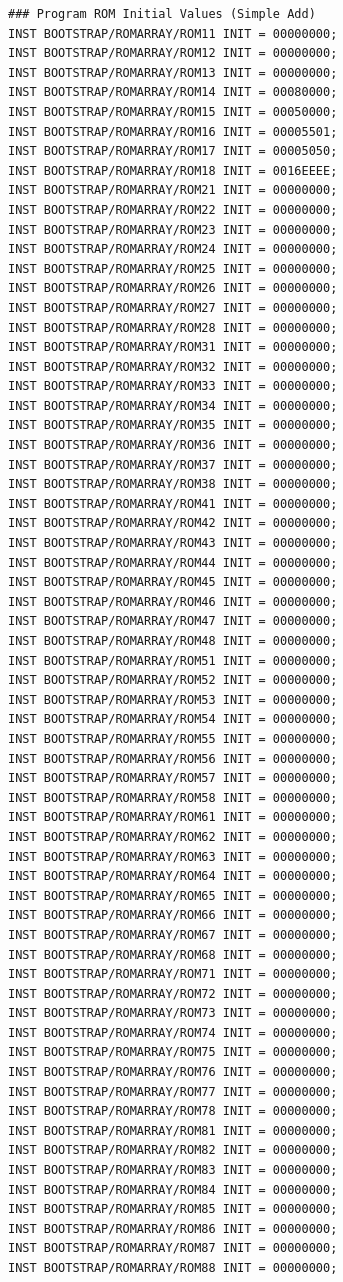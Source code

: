 \documentclass[12pt]{article}
\begin{document}
\begin{Verbatim}[frame=single, fontsize= \small]
### Program ROM Initial Values (Simple Add)
INST BOOTSTRAP/ROMARRAY/ROM11 INIT = 00000000;	
INST BOOTSTRAP/ROMARRAY/ROM12 INIT = 00000000;	
INST BOOTSTRAP/ROMARRAY/ROM13 INIT = 00000000;	
INST BOOTSTRAP/ROMARRAY/ROM14 INIT = 00080000;	
INST BOOTSTRAP/ROMARRAY/ROM15 INIT = 00050000;	
INST BOOTSTRAP/ROMARRAY/ROM16 INIT = 00005501;	
INST BOOTSTRAP/ROMARRAY/ROM17 INIT = 00005050;	
INST BOOTSTRAP/ROMARRAY/ROM18 INIT = 0016EEEE;
INST BOOTSTRAP/ROMARRAY/ROM21 INIT = 00000000;	
INST BOOTSTRAP/ROMARRAY/ROM22 INIT = 00000000;	
INST BOOTSTRAP/ROMARRAY/ROM23 INIT = 00000000;	
INST BOOTSTRAP/ROMARRAY/ROM24 INIT = 00000000;	
INST BOOTSTRAP/ROMARRAY/ROM25 INIT = 00000000;	
INST BOOTSTRAP/ROMARRAY/ROM26 INIT = 00000000;	
INST BOOTSTRAP/ROMARRAY/ROM27 INIT = 00000000;	
INST BOOTSTRAP/ROMARRAY/ROM28 INIT = 00000000;
INST BOOTSTRAP/ROMARRAY/ROM31 INIT = 00000000;	
INST BOOTSTRAP/ROMARRAY/ROM32 INIT = 00000000;	
INST BOOTSTRAP/ROMARRAY/ROM33 INIT = 00000000;	
INST BOOTSTRAP/ROMARRAY/ROM34 INIT = 00000000;	
INST BOOTSTRAP/ROMARRAY/ROM35 INIT = 00000000;	
INST BOOTSTRAP/ROMARRAY/ROM36 INIT = 00000000;	
INST BOOTSTRAP/ROMARRAY/ROM37 INIT = 00000000;	
INST BOOTSTRAP/ROMARRAY/ROM38 INIT = 00000000;
INST BOOTSTRAP/ROMARRAY/ROM41 INIT = 00000000;	
INST BOOTSTRAP/ROMARRAY/ROM42 INIT = 00000000;	
INST BOOTSTRAP/ROMARRAY/ROM43 INIT = 00000000;	
INST BOOTSTRAP/ROMARRAY/ROM44 INIT = 00000000;	
INST BOOTSTRAP/ROMARRAY/ROM45 INIT = 00000000;	
INST BOOTSTRAP/ROMARRAY/ROM46 INIT = 00000000;	
INST BOOTSTRAP/ROMARRAY/ROM47 INIT = 00000000;	
INST BOOTSTRAP/ROMARRAY/ROM48 INIT = 00000000;
INST BOOTSTRAP/ROMARRAY/ROM51 INIT = 00000000;	
INST BOOTSTRAP/ROMARRAY/ROM52 INIT = 00000000;	
INST BOOTSTRAP/ROMARRAY/ROM53 INIT = 00000000;	
INST BOOTSTRAP/ROMARRAY/ROM54 INIT = 00000000;	
INST BOOTSTRAP/ROMARRAY/ROM55 INIT = 00000000;	
INST BOOTSTRAP/ROMARRAY/ROM56 INIT = 00000000;	
INST BOOTSTRAP/ROMARRAY/ROM57 INIT = 00000000;	
INST BOOTSTRAP/ROMARRAY/ROM58 INIT = 00000000;
INST BOOTSTRAP/ROMARRAY/ROM61 INIT = 00000000;	
INST BOOTSTRAP/ROMARRAY/ROM62 INIT = 00000000;	
INST BOOTSTRAP/ROMARRAY/ROM63 INIT = 00000000;	
INST BOOTSTRAP/ROMARRAY/ROM64 INIT = 00000000;	
INST BOOTSTRAP/ROMARRAY/ROM65 INIT = 00000000;	
INST BOOTSTRAP/ROMARRAY/ROM66 INIT = 00000000;	
INST BOOTSTRAP/ROMARRAY/ROM67 INIT = 00000000;	
INST BOOTSTRAP/ROMARRAY/ROM68 INIT = 00000000;
INST BOOTSTRAP/ROMARRAY/ROM71 INIT = 00000000;	
INST BOOTSTRAP/ROMARRAY/ROM72 INIT = 00000000;	
INST BOOTSTRAP/ROMARRAY/ROM73 INIT = 00000000;	
INST BOOTSTRAP/ROMARRAY/ROM74 INIT = 00000000;	
INST BOOTSTRAP/ROMARRAY/ROM75 INIT = 00000000;	
INST BOOTSTRAP/ROMARRAY/ROM76 INIT = 00000000;	
INST BOOTSTRAP/ROMARRAY/ROM77 INIT = 00000000;	
INST BOOTSTRAP/ROMARRAY/ROM78 INIT = 00000000;
INST BOOTSTRAP/ROMARRAY/ROM81 INIT = 00000000;	
INST BOOTSTRAP/ROMARRAY/ROM82 INIT = 00000000;	
INST BOOTSTRAP/ROMARRAY/ROM83 INIT = 00000000;	
INST BOOTSTRAP/ROMARRAY/ROM84 INIT = 00000000;	
INST BOOTSTRAP/ROMARRAY/ROM85 INIT = 00000000;	
INST BOOTSTRAP/ROMARRAY/ROM86 INIT = 00000000;	
INST BOOTSTRAP/ROMARRAY/ROM87 INIT = 00000000;	
INST BOOTSTRAP/ROMARRAY/ROM88 INIT = 00000000;
	\end{Verbatim}	
\end{document}
